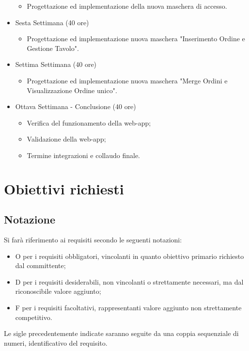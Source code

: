 \begin{itemize}
\begin{itemize}
        \item Progettazione ed implementazione della nuova maschera di accesso.
        \end{itemize}
    \item Sesta Settimana (40 ore)
    \begin{itemize}
        \item Progettazione ed implementazione nuova maschera "Inserimento Ordine e Gestione Tavolo".
    \end{itemize}
    \item Settima Settimana (40 ore)
    \begin{itemize}
        \item Progettazione ed implementazione nuova maschera "Merge Ordini e Visualizzazione Ordine unico".
    \end{itemize}
    \item Ottava Settimana - Conclusione (40 ore)
    \begin{itemize}
        \item Verifica del funzionamento della web-app;
        \item Validazione della web-app;
        \item Termine integrazioni e collaudo finale.
    \end{itemize}
\end{itemize}

\section{Obiettivi richiesti}
\subsection{Notazione}
Si farà riferimento ai requisiti secondo le seguenti notazioni:
\begin{itemize}
    \item O per i requisiti obbligatori, vincolanti in quanto obiettivo primario richiesto dal committente;
    \item D per i requisiti desiderabili, non vincolanti o strettamente necessari, ma dal riconoscibile valore
    aggiunto;
    \item F per i requisiti facoltativi, rappresentanti valore aggiunto non strettamente competitivo.
\end{itemize}
Le sigle precedentemente indicate saranno seguite da una coppia sequenziale di numeri, identificativo del
requisito.
